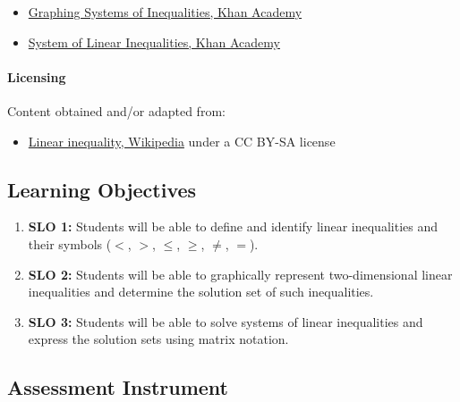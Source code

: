\begin{itemize}
    \item \href{https://www.khanacademy.org/math/algebra/x2f8bb11595b61c86:inequalities-systems-graphs/x2f8bb11595b61c86:graphing-two-variable-inequalities/v/graphing-systems-of-inequalities-2}{Graphing Systems of Inequalities, Khan Academy}
    \item \href{https://www.youtube.com/watch?v=5xQqwgS3O4U}{System of Linear Inequalities, Khan Academy}
\end{itemize}

\paragraph{Licensing}

Content obtained and/or adapted from:

\begin{itemize}
    \item \href{https://en.wikipedia.org/wiki/Linear_inequality}{Linear inequality, Wikipedia} under a CC BY-SA license
\end{itemize}

\subsection{Learning Objectives}

\begin{enumerate}
    \item \textbf{SLO 1:} Students will be able to define and identify linear inequalities and their symbols ($<$, $>$, $\leq$, $\geq$, $\neq$, $=$).
    \item \textbf{SLO 2:} Students will be able to graphically represent two-dimensional linear inequalities and determine the solution set of such inequalities.
    \item \textbf{SLO 3:} Students will be able to solve systems of linear inequalities and express the solution sets using matrix notation.
\end{enumerate}

\subsection{Assessment Instrument}

